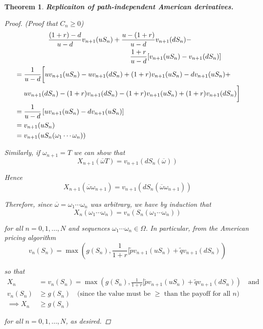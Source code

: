 \documentclass[12pt]{article}
\newtheorem{theorem}{Theorem}
\begin{document}
\begin{theorem}{\bf Replicaiton of path-independent American derivatives.}
\begin{proof} {(\em Proof that $C_n \geq 0$)}
\begin{align*}
	&\hphantom{{}={----}} \frac{(1 + r) - d}{u - d}v_{n + 1}(uS_n) + \frac{u - (1 + r)}{u - d}v_{n + 1}(dS_n) - \\
	&\hphantom{{}={----------------}} \frac{1 + r}{u - d} [ v_{n + 1}(uS_n) - v_{n + 1}(dS_n)]  \\	
	&= \frac{1}{u - d} \bigg[uv_{n + 1}(uS_n) - uv_{n + 1}(dS_n) + (1 + r)v_{n + 1}(uS_n) - dv_{n + 1}(uS_n) + \\
	&\hphantom{{}={}} uv_{n + 1}(dS_n) - (1 + r)v_{n + 1}(dS_n) - (1 + r)v_{n + 1}(uS_n) + (1 + r)v_{n + 1}(dS_n) \bigg] \\
	&= \frac{1}{u - d}\left[uv_{n + 1}(uS_n) - dv_{n + 1}(uS_n) \right] \\
	&= v_{n + 1}(uS_n) \\
	&= v_{n + 1}(uS_n(\omega_1\cdots\omega_n))
\end{align*}

Similarly, if $\omega_{n + 1} = T$ we can show that
\begin{equation*}
	X_{n + 1}(\overline{\omega} T) = v_{n + 1}(dS_n(\overline{\omega}))
\end{equation*}

Hence
\begin{equation*}
	X_{n + 1}(\overline{\omega}\omega_{n + 1}) = v_{n + 1}(dS_n(\overline{\omega}\omega_{n + 1}))
\end{equation*}

Therefore, since $\overline{\omega} = \omega_1\cdots\omega_n$ was arbitrary, we have by induction that
\begin{equation*}
	X_n(\omega_1\cdots\omega_n) = v_n(S_n(\omega_1\cdots\omega_n))
\end{equation*}

for all $n = 0,1,...,N$ and sequences $\omega_1\cdots\omega_n \in \Omega$. In particular, from the American pricing algorithm
\begin{equation*}
	v_n(S_n) = \max \left( g(S_n), \frac{1}{1 + r}[\tilde{p}v_{n + 1}(uS_n) + \tilde{q}v_{n + 1}(dS_n) \right) 
\end{equation*}

so that
\begin{align*}
	X_n &= v_n(S_n) = \max \left( g(S_n), \frac{1}{1 + r}[\tilde{p}v_{n + 1}(uS_n) + \tilde{q}v_{n + 1}(dS_n) \right) \quad \text{and } \\
	v_n(S_n) &\geq g(S_n) \quad \text{(since the value must be $\geq$ than the payoff for all $n$)} \\
	\implies X_n &\geq g(S_n)
\end{align*}

for all $n = 0,1,...,N$, as desired.
\end{proof}
\end{theorem}
\end{document}
